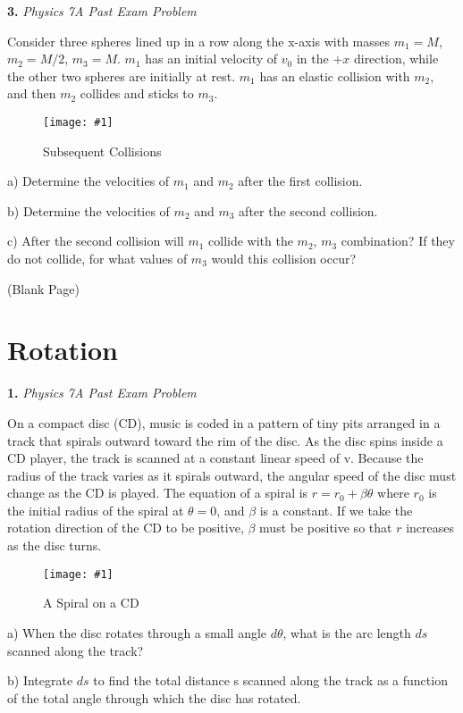 \documentclass[11pt]{article}
\newcommand{\fig}[4]{
    \begin{figure}[H]
        \centering
        \texttt{[image: \#1]}
        \caption{#2}
        \label{exp4fit}
    \end{figure}
}
\theoremstyle{gangnamstyle}{\newtheorem{definition}{Definition}[]}
\theoremstyle{gangnamstyle}{\newtheorem{example}{Example}[]}
\theoremstyle{gangnamstyle}{\newtheorem{problem}{Problem}[]}
\begin{document}
\pagebreak

\textbf{3.} \textit{Physics 7A Past Exam Problem}

Consider three spheres lined up in a row along the x-axis with masses $m_1 = M$, $m_2 = M / 2$, $m_3 = M$. $m_1$ has an initial velocity of $v_0$ in the $+x$ direction, while the other two spheres are initially at rest. $m_1$ has an elastic collision with $m_2$, and then $m_2$ collides and sticks to $m_3$.

\fig{figs/mt2/tbp2.png}{Subsequent Collisions}{0.65}{0}

a) Determine the velocities of $m_1$ and $m_2$ after the first collision. 

b) Determine the velocities of $m_2$ and $m_3$ after the second collision. 

c) After the second collision will $m_1$ collide with the $m_2$, $m_3$ combination? If they do not collide, for what values of $m_3$ would this collision occur? 

\pagebreak

\begin{center}
(Blank Page)
\end{center}

\pagebreak

\section{Rotation}

\textbf{1.} \textit{Physics 7A Past Exam Problem}

On a compact disc (CD), music is coded in a pattern of tiny pits arranged in a track that spirals outward toward the rim of the disc. As the disc spins inside a CD player, the track is scanned at a constant linear speed of v. Because the radius of the track varies as it spirals outward, the angular speed of the disc must change as the CD is played. The equation of a spiral is $r = r_0 + \beta\theta$ where $r_0$ is the initial radius of the spiral at $\theta = 0$, and $\beta$ is a constant. If we take the rotation direction of the CD to be positive, $\beta$ must be positive so that $r$ increases as the disc turns.

\fig{figs/mt2/tbp4.png}{A Spiral on a CD}{0.7}{0}

a) When the disc rotates through a small angle $d\theta$, what is the arc length $ds$ scanned along the track?

b) Integrate $ds$ to find the total distance s scanned along the track as a function of the total angle through which the disc has rotated.
\end{document}
